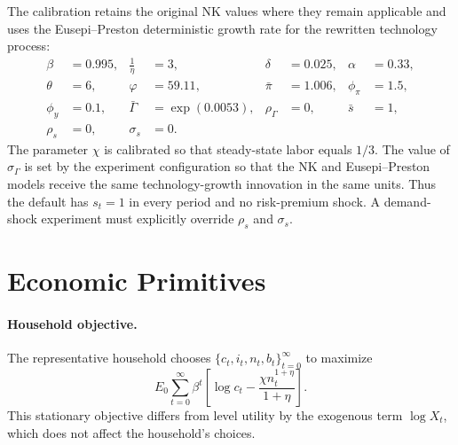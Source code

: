 \documentclass[12pt,final]{article}
\begin{document}
The calibration retains the original NK values where they remain applicable and
uses the Eusepi--Preston deterministic growth rate for the rewritten technology
process:
\begin{align*}
  \beta  & = 0.995,
         & \frac{1}{\eta} & = 3,
         & \delta         & = 0.025,
         & \alpha         & = 0.33,         \\
  \theta & = 6,
         & \varphi        & = 59.11,
         & \bar\pi        & = 1.006,
         & \phi_\pi       & = 1.5,          \\
  \phi_y & = 0.1,
         & \bar\Gamma     & = \exp(0.0053),
         & \rho_\Gamma    & = 0,
         & \bar s         & = 1,            \\
  \rho_s & = 0,
         & \sigma_s       & = 0.
\end{align*}
The parameter $\chi$ is calibrated so that steady-state labor equals $1/3$.
The value of $\sigma_\Gamma$ is set by the experiment configuration so
that the NK and Eusepi--Preston models receive the same technology-growth
innovation in the same units.
Thus the default has $s_t=1$ in every period and no risk-premium shock.  A
demand-shock experiment must explicitly override $\rho_s$ and $\sigma_s$.

\section{Economic Primitives}

\paragraph{Household objective.}
The representative household chooses $\{c_t,i_t,n_t,b_t\}_{t=0}^{\infty}$ to
maximize
\begin{equation}
  E_0\sum_{t=0}^{\infty}\beta^t
  \left[
  \log c_t-\frac{\chi n_t^{1+\eta}}{1+\eta}
  \right].
  \label{eq:utility}
\end{equation}
This stationary objective differs from level utility by the exogenous term
$\log X_t$, which does not affect the household's choices.
\end{document}
